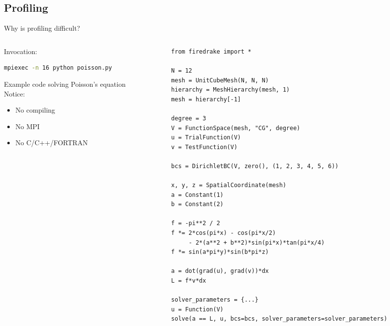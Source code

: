 \documentclass[pdf,aspectratio=169]{beamer}
\begin{document}
\subsection{Profiling}
\begin{frame}[fragile]{Why is profiling difficult?}
\begin{columns}[T]
\begin{column}[T]{0.45\textwidth}
Invocation:
\begin{lstlisting}[language={bash}]
mpiexec -n 16 python poisson.py
\end{lstlisting}

Example code solving Poisson's equation\\
Notice:
\begin{itemize}
	\item No compiling
	\item No MPI
	\item No C/C++/FORTRAN
\end{itemize}
\end{column}
\begin{column}[T]{0.45\textwidth}
\vspace{-3em}
\begin{lstlisting}[language={[highlighting]python}]
from firedrake import *

N = 12
mesh = UnitCubeMesh(N, N, N)
hierarchy = MeshHierarchy(mesh, 1)
mesh = hierarchy[-1]

degree = 3
V = FunctionSpace(mesh, "CG", degree)
u = TrialFunction(V)
v = TestFunction(V)

bcs = DirichletBC(V, zero(), (1, 2, 3, 4, 5, 6))

x, y, z = SpatialCoordinate(mesh)
a = Constant(1)
b = Constant(2)

f = -pi**2 / 2
f *= 2*cos(pi*x) - cos(pi*x/2)
     - 2*(a**2 + b**2)*sin(pi*x)*tan(pi*x/4)
f *= sin(a*pi*y)*sin(b*pi*z)

a = dot(grad(u), grad(v))*dx
L = f*v*dx

solver_parameters = {...}
u = Function(V)
solve(a == L, u, bcs=bcs, solver_parameters=solver_parameters)
\end{lstlisting}
\end{column}
\end{columns}
\end{frame}
\end{document}
